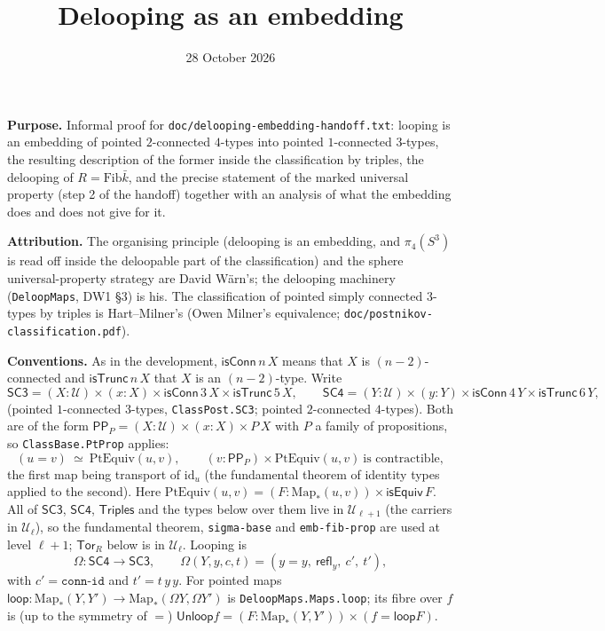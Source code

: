 \documentclass[11pt]{amsart}
\title{Delooping as an embedding}
\date{28 October 2026}
\theoremstyle{definition}
\theoremstyle{remark}
\newcommand{\Om}{\Omega}
\newcommand{\code}[1]{\texttt{#1}}
\newcommand{\cT}{\mathsf{isTrunc}}
\newcommand{\cC}{\mathsf{isConn}}
\newcommand{\refl}{\mathsf{refl}}
\newcommand{\Fib}{\mathrm{Fib}}
\newcommand{\Tor}{\mathsf{Tor}}
\newcommand{\SCt}{\mathsf{SC3}}
\newcommand{\SCf}{\mathsf{SC4}}
\newcommand{\Tri}{\mathsf{Triples}}
\newcommand{\Unloop}{\mathsf{Unloop}}
\newcommand{\Map}{\mathrm{Map}_*}
\newcommand{\PtEq}{\mathrm{PtEquiv}}
\newcommand{\lp}{\mathsf{loop}}
\newcommand{\U}{\mathcal{U}}
\begin{document}
\maketitle

\noindent\textbf{Purpose.} Informal proof for \code{doc/delooping-embedding-handoff.txt}:
looping is an embedding of pointed $2$-connected $4$-types into pointed
$1$-connected $3$-types, the resulting description of the former inside the
classification by triples, the delooping of $R=\Fib\bar k$, and the precise
statement of the marked universal property (step 2 of the handoff) together with
an analysis of what the embedding does and does not give for it.

\noindent\textbf{Attribution.} The organising principle (delooping is an
embedding, and $\pi_4(S^3)$ is read off inside the deloopable part of the
classification) and the sphere universal-property strategy are David Wärn's;
the delooping machinery (\code{DeloopMaps}, DW1 \S3) is his. The classification
of pointed simply connected $3$-types by triples is Hart--Milner's (Owen
Milner's equivalence; \code{doc/postnikov-classification.pdf}).

\noindent\textbf{Conventions.} As in the development, $\cC\,n\,X$ means that $X$
is $(n-2)$-connected and $\cT\,n\,X$ that $X$ is an $(n-2)$-type. Write
\[
  \SCt = (X:\U)\times(x:X)\times\cC\,3\,X\times\cT\,5\,X,\qquad
  \SCf = (Y:\U)\times(y:Y)\times\cC\,4\,Y\times\cT\,6\,Y,
\]
(pointed $1$-connected $3$-types, \code{ClassPost.SC3}; pointed $2$-connected
$4$-types). Both are of the form $\mathsf{PP}_P=(X:\U)\times(x:X)\times P\,X$
with $P$ a family of propositions, so \code{ClassBase.PtProp} applies:
\begin{equation}\label{eq:ptprop}
  (u=v)\ \simeq\ \PtEq(u,v),\qquad
  (v:\mathsf{PP}_P)\times\PtEq(u,v)\ \text{is contractible},
\end{equation}
the first map being transport of $\mathrm{id}_u$ (the fundamental theorem of
identity types applied to the second). Here
$\PtEq(u,v)=(F:\Map(u,v))\times\mathsf{isEquiv}\,F$. All of $\SCt$, $\SCf$, $\Tri$ and the types below over them live in
$\U_{\ell+1}$ (the carriers in $\U_\ell$), so the fundamental theorem,
\code{sigma-base} and \code{emb-fib-prop} are used at level $\ell+1$; $\Tor_R$
below is in $\U_\ell$. Looping is
\[
  \Om:\SCf\to\SCt,\qquad \Om(Y,y,c,t)=(y=y,\ \refl_y,\ c',\ t'),
\]
with $c'=\code{conn-id}$ and $t'=t\,y\,y$. For pointed maps
$\lp:\Map(Y,Y')\to\Map(\Om Y,\Om Y')$ is \code{DeloopMaps.Maps.loop}; its fibre
over $f$ is (up to the symmetry of $=$) $\Unloop f=(F:\Map(Y,Y'))\times(f=\lp F)$.
\end{document}
